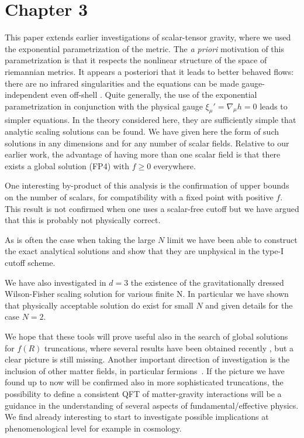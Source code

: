 \documentclass[11pt]{book} %
\numberwithin{equation}{chapter}
\begin{document}
{\section*{Chapter 3}

This paper extends earlier investigations of scalar-tensor
gravity, where we used the exponential parametrization of the metric.
The {\it a priori} motivation of this parametrization is that
it respects the nonlinear structure of the space of riemannian metrics.
It appears a posteriori that it leads to better behaved flows:
there are no infrared singularities \cite{Percacci:2015wwa,Falls:2015qga}
and the equations can be made gauge-independent even off-shell
\cite{Falls:2015qga}.
Quite generally, the use of the exponential parametrization
in conjunction with the physical gauge $\xi_\mu'=\nabla_\mu h=0$
leads to simpler equations.
In the theory considered here, they are sufficiently simple
that analytic scaling solutions can be found.
We have given here the form of such solutions in any dimensions
and for any number of scalar fields.
Relative to our earlier work, the advantage of having more than
one scalar field is that there exists a global solution (FP4)
with $f\geq 0$ everywhere.

One interesting by-product of this analysis is the confirmation
of upper bounds on the number of scalars, for compatibility with
a fixed point with positive $f$.
This result is not confirmed when one uses a scalar-free cutoff
but we have argued that this is probably not physically correct.

As is often the case when taking the large $N$ limit we have been
able to construct the exact analytical solutions
and show that they are unphysical in the type-I cutoff scheme.

We have also investigated in $d=3$ the existence of the gravitationally
dressed Wilson-Fisher scaling solution for various finite N.
In particular we have shown that physically acceptable solution do exist
for small $N$ and given details for the case $N=2$.

We hope that these tools will prove useful also in the search
of global solutions for $f(R)$ truncations,
where several results have been obtained recently
\cite{Benedetti:2012dx,Benedetti:2013jk,Demmel:2012ub,Dietz:2012ic,Dietz:2013sba,Demmel:2015oqa},
but a clear picture is still missing.
Another important direction of investigation is the inclusion of other matter fields,
in particular fermions~\cite{Zanusso:2009bs,Vacca:2010mj,Eichhorn:2011pc,Vacca:2015nta}.
If the picture we have found up to now will be confirmed also in more sophisticated truncations,
the possibility to define a consistent QFT of matter-gravity interactions
will be a guidance in the understanding of several aspects of fundamental/effective physics.
We find already interesting to start to investigate possible implications at
phenomenological level for example in cosmology.


}
\end{document}
